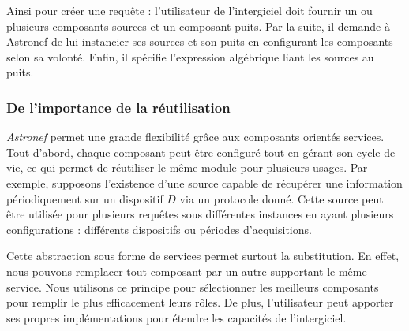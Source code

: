 Ainsi pour créer une requête : l'utilisateur de l'intergiciel doit fournir un ou plusieurs composants sources et un composant puits. Par la suite, il demande à Astronef de lui instancier ses sources et son puits en configurant les composants selon sa volonté. Enfin, il spécifie l'expression algébrique liant les sources au puits.

\subsubsection{De l'importance de la réutilisation}
\textit{Astronef} permet une grande flexibilité grâce aux composants orientés services. Tout d'abord, chaque composant peut être configuré tout en gérant son cycle de vie, ce qui permet de réutiliser le même module pour plusieurs usages. Par exemple, supposons l'existence d'une source capable de récupérer une information périodiquement sur un dispositif $D$ via un protocole donné. Cette source peut être utilisée pour plusieurs requêtes sous différentes instances en ayant plusieurs configurations : différents dispositifs ou périodes d'acquisitions.

Cette abstraction sous forme de services permet surtout la substitution. En effet, nous pouvons remplacer tout composant par un autre supportant le même service. Nous utilisons ce principe pour sélectionner les meilleurs composants pour remplir le plus efficacement leurs rôles. De plus, l'utilisateur peut apporter ses propres implémentations pour étendre les capacités de l'intergiciel.
